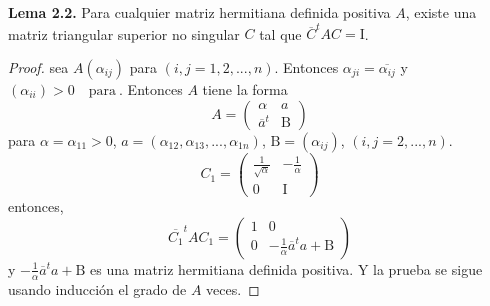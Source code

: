 \documentclass[12pt]{book}
\theoremstyle{definition}
\newcounter{in}
\newcounter{ini}
\begin{document}
\textbf{Lema 2.2.} Para cualquier matriz hermitiana definida positiva
$A$, existe una matriz triangular superior no singular $C$ tal que
$\overline{C}^{t}AC=\mathrm{I}$.
\begin{proof}
  sea $A\left(\alpha_{ij}\right)$ para
  $\left(i,j=1,2,...,n\right)$. Entonces
  $\alpha_{ji}=\overline{\alpha_{ij}}$ y
  $\left(\alpha_{ii}\right)>0 \quad \mathrm{para\ }$. Entonces $A$
  tiene la forma
\begin{equation*}
  A=
  \begin{pmatrix}
    \alpha & a \\ 
    \overline{a}^{t} & \mathrm{B}
  \end{pmatrix}
\end{equation*}
para $\alpha=\alpha_{11}>0$,
$ a= \left(\alpha_{12},\alpha_{13},...,\alpha_{1n} \right) $,
$ \mathrm{B}=\left(\alpha_{ij}\right)$, $ \left(i,j=2,...,n\right) $.
\begin{equation*} 
  C_{1}=
  \begin{pmatrix}
    \frac{1}{\sqrt{\alpha}} & -\frac{1}{\alpha} \\ 
    0 & \mathrm{I}
  \end{pmatrix}
\end{equation*}
entonces, 
\begin{equation*}
  \overline{C_{1}}^{t}AC_{1} =
  \begin{pmatrix}
    1 & 0 \\ 
    0 & -\frac{1}{\alpha}\overline{a}^{t}a+\mathrm{B}
  \end{pmatrix}
\end{equation*}  
y $-\frac{1}{\alpha}\overline{a}^{t}a+\mathrm{B}$ es una matriz
hermitiana definida positiva. Y la prueba se sigue usando inducción el
grado de $A$ veces.
\end{proof}
\end{document}
